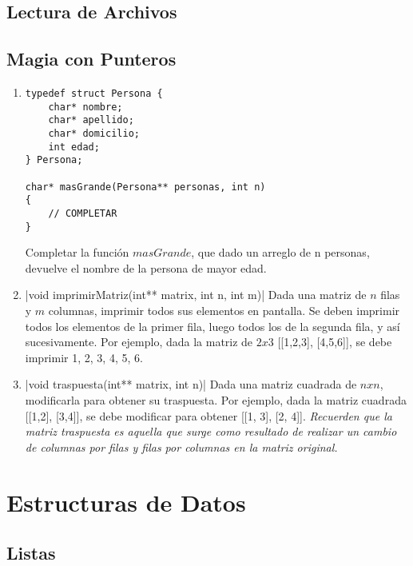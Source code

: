 \documentclass[titlepage,oneside]{book}
\begin{document}
\chapter{Lectura de Archivos}

\chapter{Magia con Punteros}

\begin{enumerate}

    \item\begin{verbatim}
typedef struct Persona {
    char* nombre;
    char* apellido;
    char* domicilio;
    int edad;
} Persona;

char* masGrande(Persona** personas, int n)
{
    // COMPLETAR
}
    \end{verbatim}

    Completar la función $masGrande$, que dado un arreglo de n personas, devuelve el nombre de la persona de mayor edad.

    \item {}|void imprimirMatriz(int** matrix, int n, int m)|
    Dada una matriz de $n$ filas y $m$ columnas, imprimir todos sus elementos en pantalla. Se deben imprimir todos los elementos de la primer fila, luego todos los de la segunda fila, y así sucesivamente. Por ejemplo, dada la matriz de $2x3$ [[1,2,3], [4,5,6]], se debe imprimir 1, 2, 3, 4, 5, 6.
    
    \item {}|void traspuesta(int** matrix, int n)|
    Dada una matriz cuadrada de $nxn$, modificarla para obtener su traspuesta. Por ejemplo, dada la matriz cuadrada [[1,2], [3,4]], se debe modificar para obtener [[1, 3], [2, 4]]. \textit{Recuerden que la matriz traspuesta es aquella que surge como resultado de realizar un cambio de columnas por filas y filas por columnas en la matriz original.}
    
\end{enumerate}


\part{Estructuras de Datos}
\chapter{Listas}
\end{document}
